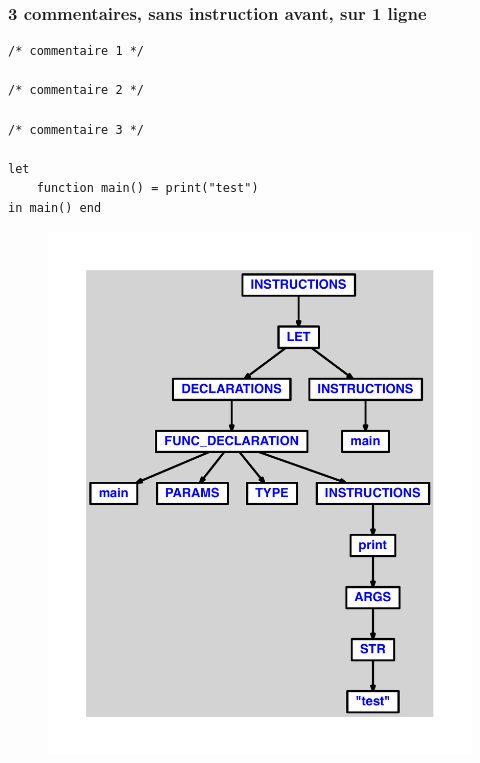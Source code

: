 \documentclass{article}
\begin{document}
\subsubsection{3 commentaires, sans instruction avant, sur 1 ligne}
\begin{lstlisting}
/* commentaire 1 */

/* commentaire 2 */

/* commentaire 3 */

let
	function main() = print("test")
in main() end
\end{lstlisting}
\newpage
\begin{figure}[H]
\centering
\includegraphics[max width=\textwidth]{ast/ast_158.pdf}
\end{figure}
\newpage
\end{document}
